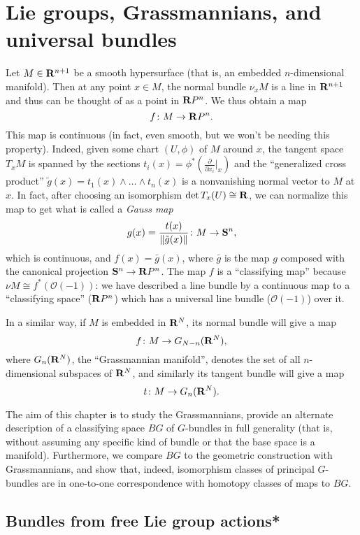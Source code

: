 \documentclass[a4paper,openany]{scrbook}
\begin{document}
\chapter{Lie groups, Grassmannians, and universal bundles}

Let $M \in \R^{n+1}$ be a smooth hypersurface (that is, an embedded $n$-dimensional manifold). Then at any point $x \in M$, the normal bundle $\nu_x M$ is a line in $\R^{n+1}$ and thus can be thought of as a point in $\R P^n$. We thus obtain a map
\[
f\colon M \to \R P^n.
\]
This map is continuous (in fact, even smooth, but we won't be needing this property). Indeed, given some chart $(U,\phi)$ of $M$ around $x$, the tangent space $T_xM$ is spanned by the sections $t_i(x) = \phi^*(\frac{\partial}{\partial x_i}|_x)$ and the ``generalized cross product'' $\tilde g(x) = t_1(x) \wedge \dots \wedge t_n(x)$ is a nonvanishing normal vector to $M$ at $x$. In fact, after choosing an isomorphism $\det T_x(U) \cong \R$, we can normalize this map to get what is called a \emph{Gauss map}
\[
g(x) = \frac{t(x)}{\|\tilde g(x)\|} \colon M \to \S^n,
\]
which is continuous, and $f(x) = \bar g(x)$, where $\bar g$ is the map $g$ composed with the canonical projection $\S^n \to \R P^n$. The map $f$ is a ``classifying map'' because $\nu M \cong f^*(\mathcal O(-1))$: we have described a line bundle by a continuous map to a ``classifying space'' ($\R P^n$) which has a universal line bundle ($\mathcal O(-1)$) over it.

In a similar way, if $M$ is embedded in $\R^N$, its normal bundle will give a map
\[
f\colon M \to G_{N-n}(\R^N),
\]
where $G_n(\R^N)$, the ``Grassmannian manifold'', denotes the set of all $n$-dimensional subspaces of $\R^N$, and similarly its tangent bundle will give a map
\[
t\colon M \to G_n(\R^N).
\]

The aim of this chapter is to study the Grassmannians, provide an alternate description of a classifying space $BG$ of $G$-bundles in full generality (that is, without assuming any specific kind of bundle or that the base space is a manifold). Furthermore, we compare $BG$ to the geometric construction with Grassmannians, and show that, indeed, isomorphism classes of principal $G$-bundles are in one-to-one correspondence with homotopy classes of maps to $BG$.

\section{Bundles from free Lie group actions*}
\end{document}
